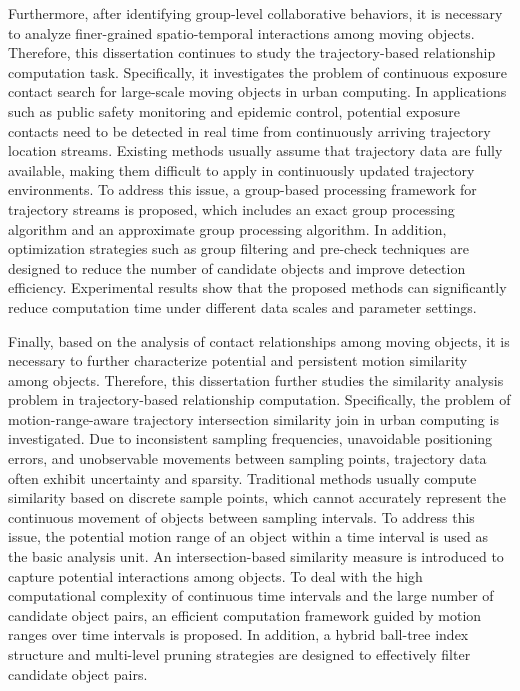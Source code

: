 Furthermore, after identifying group-level collaborative behaviors, it is necessary to analyze finer-grained spatio-temporal interactions among moving objects. Therefore, this dissertation continues to study the trajectory-based relationship computation task. Specifically, it investigates the problem of continuous exposure contact search for large-scale moving objects in urban computing. In applications such as public safety monitoring and epidemic control, potential exposure contacts need to be detected in real time from continuously arriving trajectory location streams. Existing methods usually assume that trajectory data are fully available, making them difficult to apply in continuously updated trajectory environments. To address this issue, a group-based processing framework for trajectory streams is proposed, which includes an exact group processing algorithm and an approximate group processing algorithm. In addition, optimization strategies such as group filtering and pre-check techniques are designed to reduce the number of candidate objects and improve detection efficiency. Experimental results show that the proposed methods can significantly reduce computation time under different data scales and parameter settings.

Finally, based on the analysis of contact relationships among moving objects, it is necessary to further characterize potential and persistent motion similarity among objects. Therefore, this dissertation further studies the similarity analysis problem in trajectory-based relationship computation. Specifically, the problem of motion-range-aware trajectory intersection similarity join in urban computing is investigated. Due to inconsistent sampling frequencies, unavoidable positioning errors, and unobservable movements between sampling points, trajectory data often exhibit uncertainty and sparsity. Traditional methods usually compute similarity based on discrete sample points, which cannot accurately represent the continuous movement of objects between sampling intervals. To address this issue, the potential motion range of an object within a time interval is used as the basic analysis unit. An intersection-based similarity measure is introduced to capture potential interactions among objects. To deal with the high computational complexity of continuous time intervals and the large number of candidate object pairs, an efficient computation framework guided by motion ranges over time intervals is proposed. In addition, a hybrid ball-tree index structure and multi-level pruning strategies are designed to effectively filter candidate object pairs.

